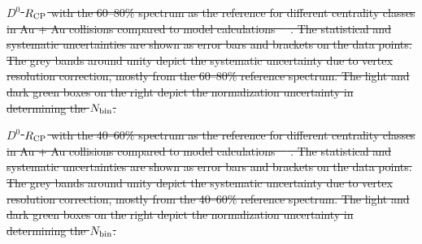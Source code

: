 \documentclass[%
 reprint,	
 amsmath,amssymb,
 aps,
 prc,
]{revtex4-1}
\providecommand{\DIFdeltex}[1]{{\protect\color{red}\sout{#1}}}                      %
\providecommand{\DIFdelbegin}{} %
\providecommand{\DIFdelend}{} %
\providecommand{\DIFdelFL}[1]{\DIFdel{#1}} %
\providecommand{\DIFdel}[1]{\texorpdfstring{\DIFdeltex{#1}}{}} %
\begin{document}
\DIFdelbegin %
{%
\DIFdelFL{$D^{0}$ $R_{\rm CP}$ with the 60--80\% spectrum as the reference for different centrality classes in Au + Au collisions compared to model calculations~\mbox{%
\cite{Cao:2016gvr,LBT:private}}%
. The statistical and systematic uncertainties are shown as error bars and brackets on the data points. The grey bands around unity depict the systematic uncertainty due to vertex resolution correction, mostly from the 60--80\% reference spectrum. The light and dark green boxes on the right depict the normalization uncertainty in determining the $N_{\rm bin}$.}}

{%
\DIFdelFL{$D^{0}$ $R_{\rm CP}$ with the 40--60\% spectrum as the reference for different centrality classes in Au + Au collisions compared to model calculations~\mbox{%
\cite{Cao:2016gvr,LBT:private,Xu:2017obm}}%
. The statistical and systematic uncertainties are shown as error bars and brackets on the data points. The grey bands around unity depict the systematic uncertainty due to vertex resolution correction, mostly from the 40--60\% reference spectrum. The light and dark green boxes on the right depict the normalization uncertainty in determining the $N_{\rm bin}$.}}

\DIFdelend %
\end{document}
